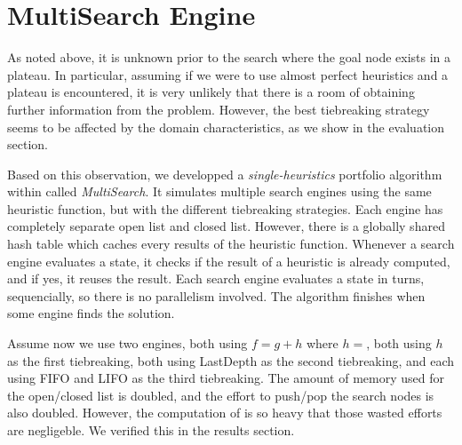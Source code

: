 
 
\section{MultiSearch Engine}

As noted above, it is unknown prior to the search where the goal node
exists in a plateau. In particular, assuming if we were to use almost
perfect heuristics and a plateau is encountered, it is very unlikely
that there is a room of obtaining further information from the problem.
However, the best tiebreaking strategy seems to be affected by the domain
characteristics, as we show in the evaluation section.

Based on this observation, we developped a \emph{single-heuristics} portfolio
algorithm within \astar called \emph{MultiSearch}.  It simulates
multiple search engines using the same heuristic function, but with the
different tiebreaking strategies.  Each engine has completely separate
open list and closed list.  However, there is a globally shared hash
table which caches every results of the heuristic function.  Whenever a
search engine evaluates a state, it checks if the result of a heuristic is
already computed, and if yes, it reuses the result.  Each search engine
evaluates a state in turns, sequencially, so there is no parallelism
involved. The algorithm finishes when some engine finds the solution.

Assume now we use two \astar engines, both using $f=g+h$ where
$h=$\lmcut, both using $h$ as the first tiebreaking, both using
LastDepth as the second tiebreaking, and each using FIFO and LIFO as the third tiebreaking.
The amount of memory used for the open/closed list is doubled, and the effort to push/pop the search nodes is also doubled.
However, the computation of \lmcut is so heavy that those wasted efforts are negligeble.
We verified this in the results section.

% 

